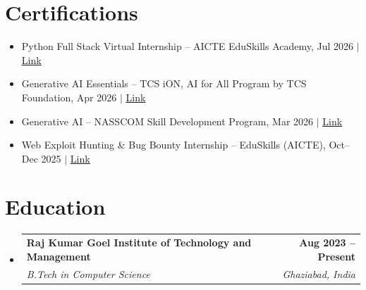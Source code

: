 \documentclass[letterpaper,10pt]{article}
\makeatletter
\newcommand{\resumeSubheading}[4]{
  \vspace{-2pt}\item
    \begin{tabular*}{1.0\textwidth}[t]{l@{\extracolsep{\fill}}r}
      \textbf{#1} & \textbf{\small #2} \\
      \textit{\small#3} & \textit{\small #4} \\
    \end{tabular*}\vspace{-7pt}
}
\newcommand{\resumeSubHeadingListStart}{\begin{itemize}[leftmargin=0.0in, label={}]}
\newcommand{\resumeSubHeadingListEnd}{\end{itemize}}
\makeatother
\begin{document}
\vspace{-16pt}


\section{Certifications}

\begin{itemize}[leftmargin=0.15in]
    \item Python Full Stack Virtual Internship -- AICTE EduSkills Academy, Jul 2026 $|$
    \href{https://drive.google.com/file/d/1_X0HXH5puKRoZ1SxIBKoHJusLX_jFQWE/view?usp=sharing}{\underline{Link}}

    \item Generative AI Essentials -- TCS iON, AI for All Program by TCS Foundation, Apr 2026 $|$
    \href{https://drive.google.com/file/d/10FpWT7E7aE3Kzll4Rk8LwPddTzlpSe5D/view?usp=sharing}{\underline{Link}}

    \item Generative AI -- NASSCOM Skill Development Program, Mar 2026 $|$
    \href{https://drive.google.com/file/d/1i5MsSEsgVp0_h6ychp4GGZkM8Xd9guUY/view?usp=sharing}{\underline{Link}}

    \item Web Exploit Hunting \& Bug Bounty Internship -- EduSkills (AICTE), Oct--Dec 2025 $|$
    \href{https://drive.google.com/file/d/1WtIs0bqc2XAlK8bL47b2jC8LrXY9NWc-/view?usp=sharing}{\underline{Link}}
\end{itemize}

\vspace{-16pt}


\section{Education}

\resumeSubHeadingListStart

\resumeSubheading
{Raj Kumar Goel Institute of Technology and Management}{Aug 2023 -- Present}
{B.Tech in Computer Science}{Ghaziabad, India}

\resumeSubHeadingListEnd
\end{document}
